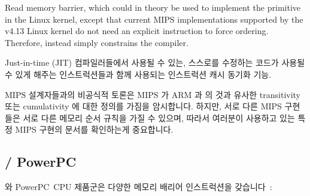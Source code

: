 \begin{description}[style=nextline]
	Read memory barrier, which could in theory be used to implement the
	 primitive in the Linux kernel, except that current
	MIPS implementations supported by the v4.13 Linux kernel do not
	need an explicit instruction to force ordering.
	Therefore,  instead simply constrains the compiler.
	\fi
\item[\tco{SYNCI}]
	Just-in-time (JIT) 컴파일러들에서 사용될 수 있는, 스스로를 수정하는
	코드가 사용될 수 있게 해주는 인스트럭션들과 함께 사용되는 인스트럭션
	캐시 동기화 기능.

\end{description}

MIPS 설계자들과의 비공식적 토론은 MIPS 가 ARM 과 \Power{} 의 것과 유사한
transitivity 또는 cumulativity 에 대한 정의를 가짐을 암시합니다.
하지만, 서로 다른 MIPS 구현들은 서로 다른 메모리 순서 규칙을 가질 수 있으며,
따라서 여러분이 사용하고 있는 특정 MIPS 구현의 문서를 확인하는게 중요합니다.

\subsection{\Power{} / PowerPC}
\label{sec:memorder:POWER / PowerPC}

\Power{} 와 PowerPC\mytextregistered\ CPU 제품군은 다양한 메모리
배리어 인스트럭션을 갖습니다~\cite{PowerPC94,MichaelLyons05a}:
\iffalse

